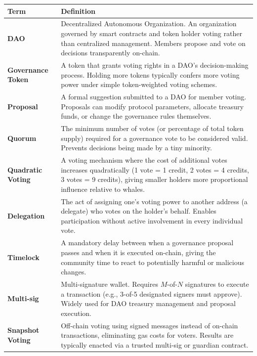 \documentclass[11pt,a4paper]{article}
\begin{document}
\renewcommand{\arraystretch}{1.25}
\noindent\begin{tabular}{@{}p{3.6cm}p{11.0cm}@{}}
\toprule
\textbf{Term} & \textbf{Definition} \\
\midrule
\textbf{DAO}                        & Decentralized Autonomous Organization. An organization governed by smart contracts and token holder voting rather than centralized management. Members propose and vote on decisions transparently on-chain. \\
\textbf{Governance Token}           & A token that grants voting rights in a DAO's decision-making process. Holding more tokens typically confers more voting power under simple token-weighted voting schemes. \\
\textbf{Proposal}                   & A formal suggestion submitted to a DAO for member voting. Proposals can modify protocol parameters, allocate treasury funds, or change the governance rules themselves. \\
\textbf{Quorum}                     & The minimum number of votes (or percentage of total token supply) required for a governance vote to be considered valid. Prevents decisions being made by a tiny minority. \\
\textbf{Quadratic Voting}           & A voting mechanism where the cost of additional votes increases quadratically (1 vote = 1 credit, 2 votes = 4 credits, 3 votes = 9 credits), giving smaller holders more proportional influence relative to whales. \\
\textbf{Delegation}                 & The act of assigning one's voting power to another address (a delegate) who votes on the holder's behalf. Enables participation without active involvement in every individual vote. \\
\textbf{Timelock}                   & A mandatory delay between when a governance proposal passes and when it is executed on-chain, giving the community time to react to potentially harmful or malicious changes. \\
\textbf{Multi-sig}                  & Multi-signature wallet. Requires $M$-of-$N$ signatures to execute a transaction (e.g., 3-of-5 designated signers must approve). Widely used for DAO treasury management and proposal execution. \\
\textbf{Snapshot Voting}            & Off-chain voting using signed messages instead of on-chain transactions, eliminating gas costs for voters. Results are typically enacted via a trusted multi-sig or guardian contract. \\

\end{tabular}
\end{document}
